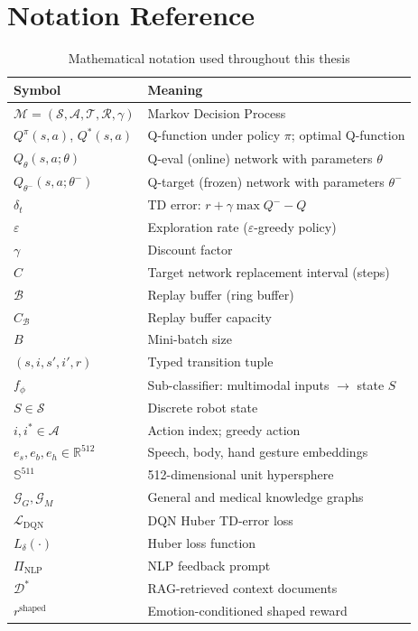\documentclass[12pt,a4paper]{article}
\theoremstyle{definition}
\theoremstyle{plain}
\theoremstyle{remark}
\newcommand{\R}{\mathbb{R}}
\newcommand{\Sph}{\mathbb{S}}
\newcommand{\Loss}{\mathcal{L}}
\newcommand{\KG}{\mathcal{G}}
\newcommand{\Qeval}{Q_\theta}
\newcommand{\Qtgt}{Q_{\theta^-}}
\begin{document}
\section{Notation Reference}

\begin{table}[H]
\centering
\caption{Mathematical notation used throughout this thesis}
\begin{tabular}{ll}
\toprule
\textbf{Symbol} & \textbf{Meaning} \\
\midrule
$\mathcal{M} = (\mathcal{S}, \mathcal{A}, \mathcal{T}, \mathcal{R}, \gamma)$ & Markov Decision Process \\
$Q^\pi(s,a)$, $Q^*(s,a)$ & Q-function under policy $\pi$; optimal Q-function \\
$\Qeval(s,a;\theta)$ & Q-eval (online) network with parameters $\theta$ \\
$\Qtgt(s,a;\theta^-)$ & Q-target (frozen) network with parameters $\theta^-$ \\
$\delta_t$ & TD error: $r + \gamma \max Q^- - Q$ \\
$\varepsilon$ & Exploration rate ($\varepsilon$-greedy policy) \\
$\gamma$ & Discount factor \\
$C$ & Target network replacement interval (steps) \\
$\mathcal{B}$ & Replay buffer (ring buffer) \\
$C_\mathcal{B}$ & Replay buffer capacity \\
$B$ & Mini-batch size \\
$(s, i, s', i', r)$ & Typed transition tuple \\
$f_\phi$ & Sub-classifier: multimodal inputs $\to$ state $S$ \\
$S \in \mathcal{S}$ & Discrete robot state \\
$i, i^* \in \mathcal{A}$ & Action index; greedy action \\
$e_s, e_b, e_h \in \R^{512}$ & Speech, body, hand gesture embeddings \\
$\Sph^{511}$ & 512-dimensional unit hypersphere \\
$\KG_G, \KG_M$ & General and medical knowledge graphs \\
$\Loss_{\text{DQN}}$ & DQN Huber TD-error loss \\
$L_\delta(\cdot)$ & Huber loss function \\
$\Pi_{\text{NLP}}$ & NLP feedback prompt \\
$\mathcal{D}^*$ & RAG-retrieved context documents \\
$r^{\text{shaped}}$ & Emotion-conditioned shaped reward \\
\bottomrule
\end{tabular}
\end{table}
\end{document}
